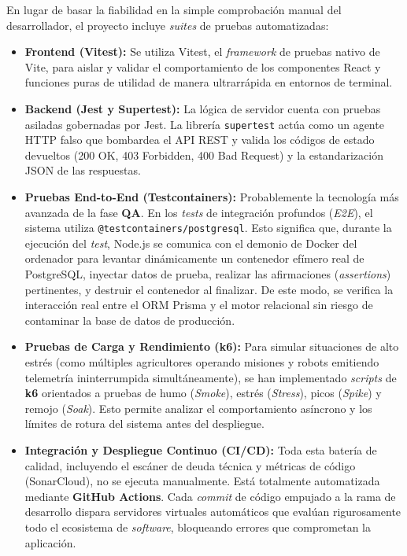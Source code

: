 En lugar de basar la fiabilidad en la simple comprobación manual del desarrollador, el proyecto incluye \textit{suites} de pruebas automatizadas:
\begin{itemize}
    \item \textbf{Frontend (Vitest):} Se utiliza Vitest, el \textit{framework} de pruebas nativo de Vite, para aislar y validar el comportamiento de los componentes React y funciones puras de utilidad de manera ultrarrápida en entornos de terminal.
    \item \textbf{Backend (Jest y Supertest):} La lógica de servidor cuenta con pruebas asiladas gobernadas por Jest. La librería \texttt{supertest} actúa como un agente HTTP falso que bombardea el API REST y valida los códigos de estado devueltos (200 OK, 403 Forbidden, 400 Bad Request) y la estandarización JSON de las respuestas.
    \item \textbf{Pruebas End-to-End (Testcontainers):} Probablemente la tecnología más avanzada de la fase \textbf{QA}. En los \textit{tests} de integración profundos (\textit{E2E}), el sistema utiliza \texttt{@testcontainers/postgresql}. Esto significa que, durante la ejecución del \textit{test}, Node.js se comunica con el demonio de Docker del ordenador para levantar dinámicamente un contenedor efímero real de PostgreSQL, inyectar datos de prueba, realizar las afirmaciones (\textit{assertions}) pertinentes, y destruir el contenedor al finalizar. De este modo, se verifica la interacción real entre el ORM Prisma y el motor relacional sin riesgo de contaminar la base de datos de producción.
    \item \textbf{Pruebas de Carga y Rendimiento (k6):} Para simular situaciones de alto estrés (como múltiples agricultores operando misiones y robots emitiendo telemetría ininterrumpida simultáneamente), se han implementado \textit{scripts} de \textbf{k6} orientados a pruebas de humo (\textit{Smoke}), estrés (\textit{Stress}), picos (\textit{Spike}) y remojo (\textit{Soak}). Esto permite analizar el comportamiento asíncrono y los límites de rotura del sistema antes del despliegue.
    \item \textbf{Integración y Despliegue Continuo (CI/CD):} Toda esta batería de calidad, incluyendo el escáner de deuda técnica y métricas de código (SonarCloud), no se ejecuta manualmente. Está totalmente automatizada mediante \textbf{GitHub Actions}. Cada \textit{commit} de código empujado a la rama de desarrollo dispara servidores virtuales automáticos que evalúan rigurosamente todo el ecosistema de \textit{software}, bloqueando errores que comprometan la aplicación.
\end{itemize}
